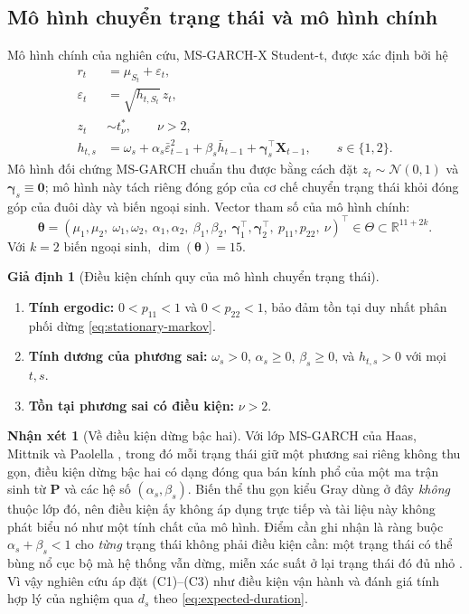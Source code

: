 \documentclass[12pt,a4paper]{article}
\numberwithin{equation}{section}
\theoremstyle{definition}
\newtheorem{assumption}{Giả định}[section]
\newtheorem{remark}{Nhận xét}[section]
\newcommand{\R}{\mathbb{R}}
\newcommand{\Param}{\symbf{\theta}}
\newcommand{\Xvec}{\symbf{X}}
\newcommand{\Pmat}{\symbf{P}}
\newcommand{\bmgamma}{\symbf{\gamma}}
\begin{document}
\subsection{Mô hình chuyển trạng thái và mô hình chính}\label{subsec:main-model}
Mô hình chính của nghiên cứu, MS-GARCH-X Student-t, được xác định bởi hệ
\begin{align}
  r_t &= \mu_{S_t}+\varepsilon_t,
  \label{eq:main-mean}\\
  \varepsilon_t &= \sqrt{h_{t,S_t}}\,z_t,
  \label{eq:main-error}\\
  z_t &\sim t^{*}_{\nu},\qquad \nu>2,
  \label{eq:main-dist}\\
  h_{t,s} &= \omega_s+\alpha_s\bar\varepsilon_{t-1}^{2}
  +\beta_s\bar h_{t-1}+\bmgamma_s^{\top}\Xvec_{t-1},
  \qquad s\in\{1,2\}.
  \label{eq:main-variance}
\end{align}
Mô hình đối chứng MS-GARCH chuẩn thu được bằng cách đặt $z_t\sim\mathcal{N}(0,1)$ và
$\bmgamma_s\equiv\symbf 0$; mô hình này tách riêng đóng góp của cơ chế chuyển trạng thái
khỏi đóng góp của đuôi dày và biến ngoại sinh. Vector tham số của mô hình chính:
\begin{equation}
  \Param=\left(\mu_1,\mu_2,\ \omega_1,\omega_2,\ \alpha_1,\alpha_2,\ \beta_1,\beta_2,\
  \bmgamma_1^{\top},\bmgamma_2^{\top},\ p_{11},p_{22},\ \nu\right)^{\top}
  \in\Theta\subset\R^{11+2k}.
  \label{eq:parameter-vector}
\end{equation}
Với $k=2$ biến ngoại sinh, $\dim(\Param)=15$.

\begin{assumption}[Điều kiện chính quy của mô hình chuyển trạng thái]\label{as:ms}
\leavevmode
\begin{enumerate}
  \item[(C1)] \textbf{Tính ergodic:} $0<p_{11}<1$ và $0<p_{22}<1$, bảo đảm tồn tại duy
  nhất phân phối dừng \eqref{eq:stationary-markov}.
  \item[(C2)] \textbf{Tính dương của phương sai:} $\omega_s>0$, $\alpha_s\ge 0$,
  $\beta_s\ge 0$, và $h_{t,s}>0$ với mọi $t,s$.
  \item[(C3)] \textbf{Tồn tại phương sai có điều kiện:} $\nu>2$.
\end{enumerate}
\end{assumption}

\begin{remark}[Về điều kiện dừng bậc hai]\label{rem:stationarity}
Với lớp MS-GARCH của Haas, Mittnik và Paolella \cite{haas2004}, trong đó mỗi trạng thái
giữ một phương sai riêng không thu gọn, điều kiện dừng bậc hai có dạng đóng qua bán kính
phổ của một ma trận sinh từ $\Pmat$ và các hệ số $(\alpha_s,\beta_s)$. Biến thể thu gọn
kiểu Gray dùng ở đây \emph{không} thuộc lớp đó, nên điều kiện ấy không áp dụng trực tiếp
và tài liệu này không phát biểu nó như một tính chất của mô hình. Điểm cần ghi nhận là
ràng buộc $\alpha_s+\beta_s<1$ cho \emph{từng} trạng thái không phải điều kiện cần: một
trạng thái có thể bùng nổ cục bộ mà hệ thống vẫn dừng, miễn xác suất ở lại trạng thái đó
đủ nhỏ \cite{francq2001}. Vì vậy nghiên cứu áp đặt (C1)--(C3) như điều kiện vận hành và
đánh giá tính hợp lý của nghiệm qua $d_s$ theo \eqref{eq:expected-duration}.
\end{remark}
\end{document}
